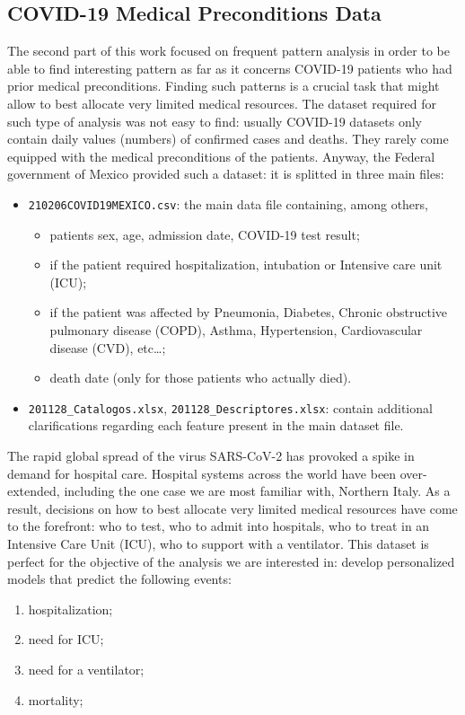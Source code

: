 \documentclass[11pt,a4paper]{article}
\begin{document}
\subsection{COVID-19 Medical Preconditions Data}
The second part of this work focused on frequent pattern analysis in order to be
able to find interesting pattern as far as it concerns COVID-19 patients who
had prior medical preconditions. Finding such patterns is a crucial task that
might allow to best allocate very limited medical resources. The dataset
required for such type of analysis was not easy to find: usually COVID-19
datasets only contain daily values (numbers) of confirmed cases and deaths. They
rarely come equipped with the medical preconditions of the patients. Anyway,
the Federal government of Mexico\cite{mexico} provided such a dataset: it is
splitted in three main files:
\begin{itemize}
    \item \texttt{210206COVID19MEXICO.csv}: the main data file containing, among
    others,
    \begin{itemize}
        \item patients sex, age, admission date, COVID-19 test result;
        \item if the patient required hospitalization, intubation or Intensive
        care unit (ICU);
        \item if the patient was affected by Pneumonia, Diabetes, Chronic
        obstructive pulmonary disease (COPD), Asthma, Hypertension,
        Cardiovascular disease (CVD), etc\dots;
        \item death date (only for those patients who actually died).
    \end{itemize}
    \item \texttt{201128\_Catalogos.xlsx}, \texttt{201128\_Descriptores.xlsx}:
    contain additional clarifications regarding each feature present in the main
    dataset file.
\end{itemize}
The rapid global spread of the virus SARS-CoV-2 has provoked a spike in
demand for hospital care. Hospital systems across the world have been
over-extended, including the one case we are most familiar with, Northern Italy.
As a result, decisions on how to best allocate very limited medical resources
have come to the forefront: who to test, who to admit into hospitals, who to
treat in an Intensive Care Unit (ICU), who to support with a ventilator.
This dataset is perfect for the objective of the analysis we are interested in:
develop personalized models that predict the following events:
\begin{enumerate}
    \item hospitalization;
    \item need for ICU;
    \item need for a ventilator;
    \item mortality;
\end{enumerate}
\end{document}
